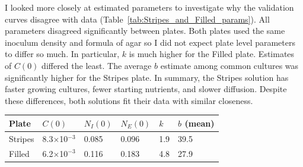 \begin{multicols}{2}
I looked more closely at estimated parameters to investigate why the
validation curves disagree with data
(Table~\ref{tab:Stripes_and_Filled_params}). All parameters disagreed
significantly between plates. Both plates used the same inoculum
density and formula of agar so I did not expect plate level parameters
to differ so much. In particular, \(k\) is much higher for the Filled
plate. Estimates of \(C(0)\) differed the least. The average \(b\)
estimate among common cultures was significantly higher for the
Stripes plate. In summary, the Stripes solution has faster growing
cultures, fewer starting nutrients, and slower diffusion.
Despite these differences, both solutions fit their data with similar
closeness.
\begin{center}
  \begin{tabular}{l l l l l l}
    \hline
    Plate     & \(C(0)\)                   & \(N_{I}(0)\) & \(N_{E}(0)\) & \(k\) & \(b\) (mean)\\
    \hline
    Stripes   & 8.3\(\times\)10\(^{-3}\)   & 0.085      & 0.096       & 1.9  & 39.5\\
    Filled    & 6.2\(\times\)10\(^{-3}\)   & 0.116      & 0.183       & 4.8  & 27.9\\
    \hline
  \end{tabular}
  \label{tab:Stripes_and_Filled_params}
\end{center}


\end{multicols}
